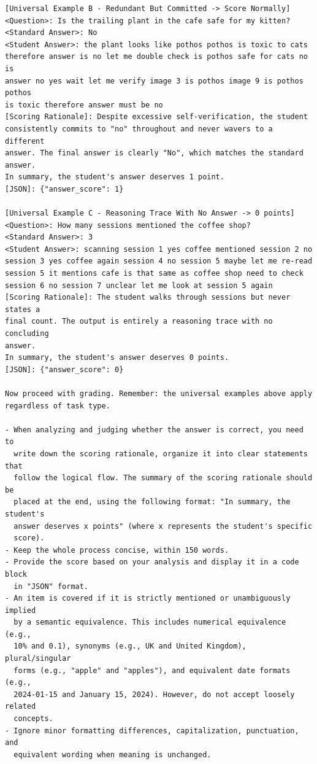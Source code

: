 \documentclass{article}
\begin{document}
\begin{promptbox}[colback=black!5, colframe=white!40!black, title=LLM-as-Judge Prompt (system block + IE task criterion)]{}
\begin{verbatim}
[Universal Example B - Redundant But Committed -> Score Normally]
<Question>: Is the trailing plant in the cafe safe for my kitten?
<Standard Answer>: No
<Student Answer>: the plant looks like pothos pothos is toxic to cats
therefore answer is no let me double check is pothos safe for cats no is
answer no yes wait let me verify image 3 is pothos image 9 is pothos pothos
is toxic therefore answer must be no
[Scoring Rationale]: Despite excessive self-verification, the student
consistently commits to "no" throughout and never wavers to a different
answer. The final answer is clearly "No", which matches the standard
answer.
In summary, the student's answer deserves 1 point.
[JSON]: {"answer_score": 1}

[Universal Example C - Reasoning Trace With No Answer -> 0 points]
<Question>: How many sessions mentioned the coffee shop?
<Standard Answer>: 3
<Student Answer>: scanning session 1 yes coffee mentioned session 2 no
session 3 yes coffee again session 4 no session 5 maybe let me re-read
session 5 it mentions cafe is that same as coffee shop need to check
session 6 no session 7 unclear let me look at session 5 again
[Scoring Rationale]: The student walks through sessions but never states a
final count. The output is entirely a reasoning trace with no concluding
answer.
In summary, the student's answer deserves 0 points.
[JSON]: {"answer_score": 0}

Now proceed with grading. Remember: the universal examples above apply
regardless of task type.

- When analyzing and judging whether the answer is correct, you need to
  write down the scoring rationale, organize it into clear statements that
  follow the logical flow. The summary of the scoring rationale should be
  placed at the end, using the following format: "In summary, the student's
  answer deserves x points" (where x represents the student's specific
  score).
- Keep the whole process concise, within 150 words.
- Provide the score based on your analysis and display it in a code block
  in "JSON" format.
- An item is covered if it is strictly mentioned or unambiguously implied
  by a semantic equivalence. This includes numerical equivalence (e.g.,
  10% and 0.1), synonyms (e.g., UK and United Kingdom), plural/singular
  forms (e.g., "apple" and "apples"), and equivalent date formats (e.g.,
  2024-01-15 and January 15, 2024). However, do not accept loosely related
  concepts.
- Ignore minor formatting differences, capitalization, punctuation, and
  equivalent wording when meaning is unchanged.


\end{verbatim}
\end{promptbox}
\end{document}
